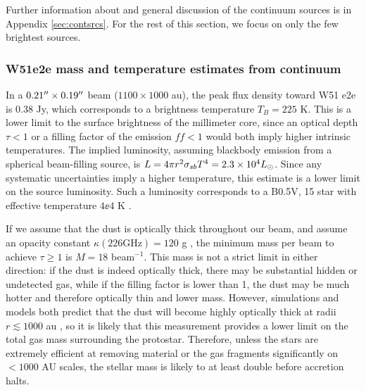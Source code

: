 \documentclass{aa}
\begin{document}
Further information about and general discussion of the continuum sources is 
in Appendix \ref{sec:contsrcs}.  For the rest of this section, we focus
on only the few brightest sources.








\subsubsection{W51e2e mass and temperature estimates from continuum}
\label{sec:W51e2e}

In a $0.21\mbox{$^{\prime\prime}$}\times0.19\mbox{$^{\prime\prime}$}$ beam ($1100\times1000$ au), the peak flux
density toward W51 e2e is 0.38 Jy, which corresponds to a brightness
temperature $T_B=225$ K.  This is a lower limit to the surface brightness of
the millimeter core, since an optical depth $\tau<1$ or a filling factor of the
emission $ff<1$ would both imply higher intrinsic temperatures.  The implied
luminosity, assuming blackbody emission from a spherical beam-filling source,
is $L = 4\pi r^2 \sigma_{sb} T^4 = 2.3\times10^{4} L_{\odot}$.  Since any systematic
uncertainties imply a higher temperature, this estimate is a lower limit on the
source luminosity.  Such a luminosity corresponds to a B0.5V, 15 \msun
star with effective temperature $4\ee{4}$ K \citep[][see
Section \ref{sec:stellarproperties} for further discussion of
stellar types]{Pecaut2013a}.


If we assume that the dust is optically thick throughout our beam, and assume
an opacity constant $\kappa(226 \mathrm{GHz})=120$ g \persc, the minimum mass
per beam to achieve $\tau\geq1$ is $M=18$ \msun beam$^{-1}$.  This  mass is not
a strict limit in either direction: if the dust is indeed optically thick,
there may be substantial hidden or undetected gas, while if the filling factor
is lower than 1, the dust may be much hotter and therefore optically thin and
lower  mass.  However, simulations and models both predict that the dust will
become highly optically thick at radii $r\lesssim1000$ au
\citep{Forgan2016a,Klassen2016a}, so it is likely that this measurement
provides  a lower limit on the total gas mass surrounding the protostar.
Therefore, unless the stars are extremely efficient at removing material or the
gas fragments significantly on $<1000$ AU scales, the stellar mass is likely to
at least double before accretion halts.
\end{document}
